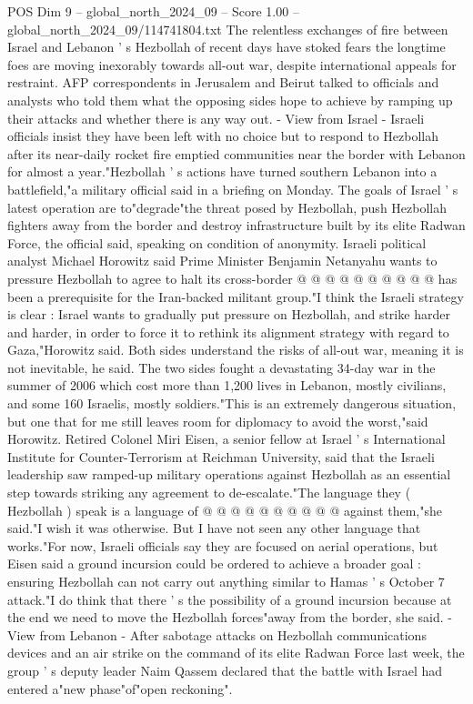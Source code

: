 \begin{textsample}{POS Dim 9 – global\_north\_2024\_09 – Score 1.00 – global\_north\_2024\_09/114741804.txt}  \label{ex:f9_pos_428}
The relentless exchanges of fire between Israel and Lebanon ' s Hezbollah of recent days have stoked fears the longtime foes are moving inexorably towards all-out war, despite international appeals for restraint.
AFP correspondents in Jerusalem and Beirut talked to officials and analysts who told them what the opposing sides hope to achieve by ramping up their attacks and whether there is any way out. - View from Israel - Israeli officials insist they have been left with no choice but to respond to Hezbollah after its near-daily rocket fire emptied communities near the border with Lebanon for almost a year."Hezbollah ' s actions have turned southern Lebanon into a battlefield,"a military official said in a briefing on Monday.
The goals of Israel ' s latest operation are to"degrade"the threat posed by Hezbollah, push Hezbollah fighters away from the border and destroy infrastructure built by its elite Radwan Force, the official said, speaking on condition of anonymity.
Israeli political analyst Michael Horowitz said Prime Minister Benjamin Netanyahu wants to pressure Hezbollah to agree to halt its cross-border @ @ @ @ @ @ @ @ @ @ has been a prerequisite for the Iran-backed militant group."I think the Israeli strategy is clear : Israel wants to gradually put pressure on Hezbollah, and strike harder and harder, in order to force it to rethink its alignment strategy with regard to Gaza,"Horowitz said.
Both sides understand the risks of all-out war, meaning it is not inevitable, he said.
The two sides fought a devastating 34-day war in the summer of 2006 which cost more than 1,200 lives in Lebanon, mostly civilians, and some 160 Israelis, mostly soldiers."This is an extremely dangerous situation, but one that for me still leaves room for diplomacy to avoid the worst,"said Horowitz.
Retired Colonel Miri Eisen, a senior fellow at Israel ' s International Institute for Counter-Terrorism at Reichman University, said that the Israeli leadership saw ramped-up military operations against Hezbollah as an essential step towards striking any agreement to de-escalate."The language they ( Hezbollah ) speak is a language of @ @ @ @ @ @ @ @ @ @ against them,"she said."I wish it was otherwise.
But I have not seen any other language that works."For now, Israeli officials say they are focused on aerial operations, but Eisen said a ground incursion could be ordered to achieve a broader goal : ensuring Hezbollah can not carry out anything similar to Hamas ' s October 7 attack."I do think that there ' s the possibility of a ground incursion because at the end we need to move the Hezbollah forces"away from the border, she said. - View from Lebanon - After sabotage attacks on Hezbollah communications devices and an air strike on the command of its elite Radwan Force last week, the group ' s deputy leader Naim Qassem declared that the battle with Israel had entered a"new phase"of"open reckoning".

\end{textsample}

